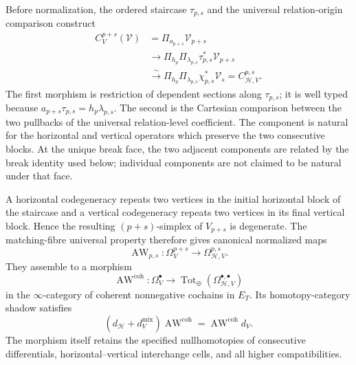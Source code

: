\begin{theorem}
\label{thm:prequantum-ordered-aw-mixed-morphism}
Before normalization, the ordered staircase $\tau_{p,s}$ and the universal
relation-origin comparison construct
\[
\begin{aligned}
C_V^{p+s}(\mathcal V)
&=
\Pi_{a_{p+s}}\mathcal V_{p+s}
\\
&\longrightarrow
\Pi_{h_p}\Pi_{\lambda_{p,s}}
\tau_{p,s}^*\mathcal V_{p+s}
\\
&\xrightarrow{\sim}
\Pi_{h_p}\Pi_{\lambda_{p,s}}
\chi_{p,s}^*\mathcal V_s
=
C_{\mathcal H,V}^{p,s}.
\end{aligned}
\]
The first morphism is restriction of dependent sections along $\tau_{p,s}$;
it is well typed because
$a_{p+s}\tau_{p,s}=h_p\lambda_{p,s}$.  The second is the Cartesian comparison
between the two pullbacks of the universal relation-level coefficient.  The
component is natural for the horizontal and vertical operators which preserve
the two consecutive blocks.  At the unique break face, the two adjacent
components are related by the break identity used below; individual components
are not claimed to be natural under that face.

A horizontal codegeneracy repeats two vertices in the initial horizontal block
of the staircase and a vertical codegeneracy repeats two vertices in its final
vertical block.  Hence the resulting $(p+s)$-simplex of $V_{p+s}$ is degenerate.
The matching-fibre universal property therefore gives canonical normalized maps
\[
\operatorname{AW}_{p,s}:
\Omega_V^{p+s}
\longrightarrow
\Omega_{\mathcal H,V}^{p,s}.
\]
They assemble to a morphism
\[
\boxed{
\operatorname{AW}^{\mathrm{coh}}:
\Omega_V^\bullet
\longrightarrow
\operatorname{Tot}_{\oplus}
(\Omega_{\mathcal H,V}^{\bullet,\bullet})
}
\]
in the $\infty$-category of coherent nonnegative cochains in $E_T$.
Its homotopy-category shadow satisfies
\[
\boxed{
(d_{\mathcal H}+d_V^{\mathrm{mix}})
\operatorname{AW}^{\mathrm{coh}}
=
\operatorname{AW}^{\mathrm{coh}}d_V.
}
\]
The morphism itself retains the specified nullhomotopies of consecutive
differentials, horizontal--vertical interchange cells, and all higher
compatibilities.
\end{theorem}

